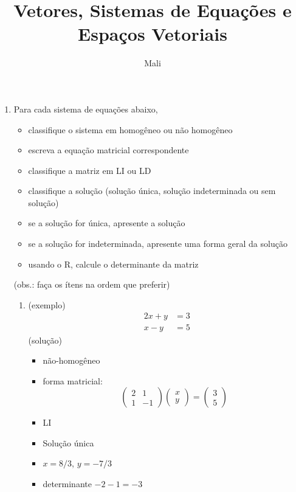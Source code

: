 \documentclass{article}
\title{Vetores, Sistemas de Equações e Espaços Vetoriais}
\author{Mali}
\begin{document}
\maketitle


\begin{enumerate}

		\item Para cada sistema de equações abaixo,
		\begin{itemize}
			\item classifique o sistema em homogêneo ou não homogêneo
			\item escreva a equação matricial correspondente
			\item classifique a matriz em LI ou LD
			\item classifique a solução (solução única, solução indeterminada ou sem solução)
			\item se a solução for única, apresente a solução
			\item se a solução for indeterminada, apresente uma forma geral da solução
			\item usando o R, calcule o determinante da matriz
		\end{itemize}
		(obs.: faça os ítens na ordem que preferir)
		\begin{enumerate}
			\item (exemplo) \begin{align}
				2x + y &= 3\\
				x -y &= 5
			\end{align}
(solução) 
		\begin{itemize}
		\item não-homogêneo
		\item forma matricial: \[ \left( \begin{array}{ccc}
			2 & 1 \\
			1 & -1 \end{array} \right)\left( \begin{array}{ccc} x\\y \end{array} \right) 
			= \left( \begin{array}{ccc} 3\\5 \end{array} \right)\] 
		\item LI
		\item Solução única
		\item $x = 8/3$, $y=-7/3$
		\item determinante $-2-1=-3$
		\end{itemize}

\end{enumerate}
\end{enumerate}
\end{document}
